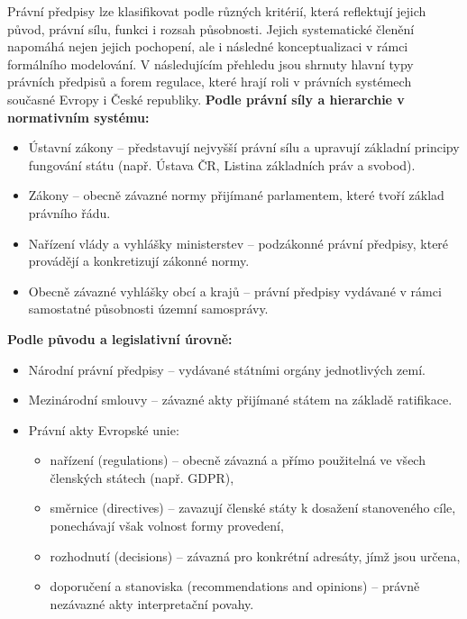 Právní předpisy lze klasifikovat podle různých kritérií, která reflektují jejich původ, právní sílu, funkci i rozsah působnosti. Jejich systematické členění napomáhá nejen jejich pochopení, ale i následné konceptualizaci v rámci formálního modelování. V následujícím přehledu jsou shrnuty hlavní typy právních předpisů a forem regulace, které hrají roli v právních systémech současné Evropy i České republiky. \cite{Sovova2014,Boguszak2001,Krumlova2009}
\vspace{1em}
\noindent \textbf{Podle právní síly a hierarchie v normativním systému:}
\begin{itemize}
  \item Ústavní zákony – představují nejvyšší právní sílu a upravují základní principy fungování státu (např. Ústava ČR, Listina základních práv a svobod).
  \item Zákony – obecně závazné normy přijímané parlamentem, které tvoří základ právního řádu.
  \item Nařízení vlády a vyhlášky ministerstev – podzákonné právní předpisy, které provádějí a konkretizují zákonné normy.
  \item Obecně závazné vyhlášky obcí a krajů – právní předpisy vydávané v rámci samostatné působnosti územní samosprávy. \cite{Sovova2014, Pecina2005}
\end{itemize}
\vspace{1em}
\noindent \textbf{Podle původu a legislativní úrovně:}
\begin{itemize}
  \item Národní právní předpisy – vydávané státními orgány jednotlivých zemí.
  \item Mezinárodní smlouvy – závazné akty přijímané státem na základě ratifikace.
  \item Právní akty Evropské unie:
  \begin{itemize}
    \item nařízení (regulations) – obecně závazná a přímo použitelná ve všech členských státech (např. GDPR),
    \item směrnice (directives) – zavazují členské státy k dosažení stanoveného cíle, ponechávají však volnost formy provedení,
    \item rozhodnutí (decisions) – závazná pro konkrétní adresáty, jímž jsou určena,
    \item doporučení a stanoviska (recommendations and opinions) – právně nezávazné akty interpretační povahy.  \cite{Ward2009}
  \end{itemize}
\end{itemize}

